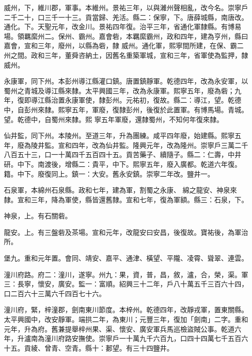 \begin{pinyinscope}
 威州，下，維川郡，軍事。本維州。景祐三年，以與濰州聲相亂，改今名。崇寧戶二千二十，口三千一十三。貢當歸、羌活。縣二：保寧，下。唐薛城縣，南唐改。通化。下。天聖元年，改金川。景祐四年復。治平三年，省通化軍隸縣。有博易場。領羈縻州二。保州、霸州。嘉會砦，本羈縻霸州，政和四年，建為亨州，縣曰嘉會，宣和三年，廢州，以縣為砦，隸
 威州。通化軍，熙寧間所建，在保、霸二州之間。政和三年，董舜咨納土，因舊名重築軍城，宣和三年，省軍使為監押，隸威州。



 永康軍，同下州。本彭州導江縣灌口鎮。唐置鎮靜軍。乾德四年，改為永安軍，以蜀州之青城及導江縣來隸。太平興國三年，改為永康軍。熙寧五年，廢為砦；九年，復即導江縣治置永康軍使，隸彭州。元祐初，復故。縣二：導江，望。乾德中，自彭州來隸。熙寧五年，軍廢，復隸彭州，後復於此置軍。有博馬場。青城。望。乾德中，自蜀州來隸。熙
 寧五年軍廢，還隸蜀州，不知何年復來隸。



 仙井監，同下州。本陵州。至道三年，升為團練。咸平四年廢，始建縣。熙寧五年，廢為陵井監。宣和四年，改為仙井監。隆興元年，改為隆州。崇寧戶三萬二千八百五十三，口一十萬四千五百四十五。貢苦藥子、續隨子。縣二：仁壽，中井研。中下。南渡後，增縣二：貴平，中下。熙寧五年，廢入廣都。乾道六年復。籍。中下。廢復同上。鎮一：大安。舊永安鎮。崇寧二年改。鹽井一。



 石泉軍，本綿州石泉縣。政和七年，建為軍，割蜀之永康、
 綿之龍安、神泉來隸。宣和三年，降為軍使，縣皆還舊隸。宣和七年，復為軍額。縣三：石泉，下。



 神泉，上。有石關砦。



 龍安。上。有三盤砦及茶場。宣和元年，改龍安曰安昌，後復故。寶祐後，為軍治所。



 堡九。重和元年置。會同、靖安、嘉平、通津、橫望、平隴、凌霄、聳翠、連雲。



 潼川府路。府二：潼川，遂寧。州九：果，資，普，昌，敘，瀘，合，榮，渠。軍三：長寧，懷安，廣安。監一：富順。紹興三十二年，戶八十萬五千三百六十四，口二百六十三萬六千四百七十六。



 潼川府，緊，梓潼郡，劍南東川節度。本梓州。乾德四年，改靜戎軍，置東關縣。太平興國中，改安靜軍。端拱二年，為東川；元豐三年，復加「劍南」二字。重和元年，升為府。舊兼提舉梓州果、渠、懷安、廣安軍兵馬巡檢盜賊公事。乾道六年，升瀘南為潼川府路安撫使。崇寧戶一十萬九千六百九，口四十四萬七千五百六十五。貢綾、曾青、空青。縣十：郪望。有三十四鹽井。




\end{pinyinscope}

